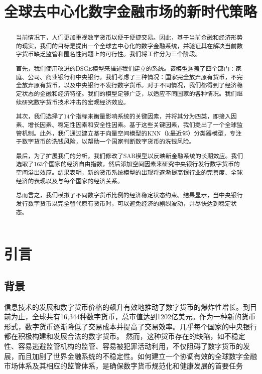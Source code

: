 \documentclass[withoutpreface,bwprint]{cumcmthesis} %
\title{全球去中心化数字金融市场的新时代策略}
\begin{document}

\begin{abstract}

当前情况下，人们更加重视数字货币以便于便捷交易。因此，基于当前金融和经济形势的现实，我们的目标是提出一个全球去中心化的数字金融系统，并验证其在解决当前数字货币缺乏监管和匿名性问题上的可行性。我们将工作分为三个阶段。

首先，我们使用改进的DSGE模型来描述我们建立的系统。该模型涵盖了四个部门：家庭、公司、商业银行和中央银行。我们考虑了三种情况：国家完全放弃原有货币，不完全放弃原有货币，以及中央银行不发行数字货币。对于不同情况，我们都得到了经济稳定状态的金融和经济特征。我们的模型足够广泛，以适应不同国家的各种情况。我们继续研究数字货币技术冲击的宏观经济效应。

其次，我们选择了14个指标来衡量影响系统的关键因素，并将其分为四类，即接入因素、增长因素、稳定性因素和安全性因素。基于这些关键因素，我们提出了一个全球监管机制。此外，我们通过建立基于向量空间模型的KNN（k最近邻）分类器模型，专注于数字货币的洗钱风险，以帮助一个国家判断数字货币的洗钱风险。

最后，为了扩展我们的分析，我们修改了SAR模型以反映新金融系统的长期效应。我们选取了163个国家的经济自由指数，然后添加空间因素来研究中央银行发行数字货币的空间溢出效应。结果表明，新的货币系统模型的出现将逐渐提高银行业的完善度、全球经济的表现以及与每个国家的经济关系。

总而言之，我们模拟了不同数字货币比例的经济稳定状态约束。结果显示，当中央银行发行数字货币以完全替代原有货币时，可以避免经济的剧烈波动，并尽快达到稳定状态。



\end{abstract}

\tableofcontents

\newpage

\section{引言}

\subsection{背景}

信息技术的发展和数字货币价格的飙升有效地推动了数字货币的爆炸性增长。到目前为止，全球共有16,344种数字货币，总市值达到1202亿美元\cite{chen2018status}。作为一种新的货币形式，数字货币逐渐降低了交易成本并提高了交易效率。几乎每个国家的中央银行都在积极构建和发展合法的数字货币。
然而，这种货币存在的缺陷，如不稳定性、容易逃避监管机构的监管、容易被犯罪活动利用，不仅阻碍了数字货币的发展，而且加剧了世界金融系统的不稳定性。如何建立一个协调有效的全球数字金融市场体系及其相应的监管体系，是确保数字货币规范化和健康发展的首要任务
\end{document}
